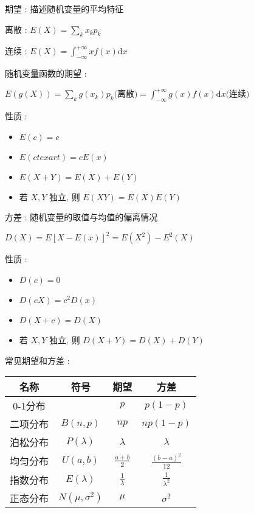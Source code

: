 \documentclass[UTF8, 12pt]{ctexart}
\begin{document}
	\noindent 期望 : 描述随机变量的平均特征

		离散 : $ E(X) = \sum\limits_{k} x_{k}p_{k} $

		连续 : $ E(X) = \int_{-\infty}^{+\infty}xf(x)\mathrm{d}x $

		随机变量函数的期望 : 

		$ E(g(X)) = \sum\limits_{k}g(x_{k})p_{k}\text{(离散)} = \int_{-\infty}^{+\infty}g(x)f(x)\mathrm{d}x\text{(连续)} $

		性质 :
		\begin{itemize}[leftmargin = 4em]
			\item $ E(c) = c $
			\item $ E(ctexart) = cE(x) $
			\item $ E(X + Y) = E(X) + E(Y) $
			\item 若 $ X, Y $ 独立, 则 $ E(XY) = E(X)E(Y) $
		\end{itemize}
	
	\noindent 方差 : 随机变量的取值与均值的偏离情况
		
		$ D(X) = E[X - E(x)]^{2} = E(X^{2}) - E^{2}(X) $

		性质 :
		\begin{itemize}[leftmargin = 4em]
			\item $ D(c) = 0 $
			\item $ D(cX) = c^{2}D(x) $
			\item $ D(X + c) = D(X) $
			\item 若 $ X, Y $ 独立, 则 $ D(X + Y) = D(X) + D(Y) $
		\end{itemize}

	\noindent 常见期望和方差 : 
	\begin{table}[ht]
		\begin{tabular}{|c|c|c|c|}
			\hline
			名称 & 符号 & 期望 & 方差 \\ \hline
			0-1分布 & & $ p $ & $ p(1-p) $ \\ \hline
			二项分布 & $ B(n, p) $ & $ np $ & $ np(1-p) $ \\ \hline
			泊松分布 & $ P(\lambda) $ & $ \lambda $ & $ \lambda $ \\ \hline
			均匀分布 & $ U(a, b) $ & $ \frac{a+b}{2} $ & $ \frac{(b-a)^{2}}{12} $ \\ \hline
			指数分布 & $ E(\lambda) $ & $ \frac{1}{\lambda} $ & $ \frac{1}{\lambda^{2}} $ \\ \hline
			正态分布 & $ N(\mu, \sigma^{2}) $ & $ \mu $ & $ \sigma^{2} $ \\ \hline
		\end{tabular}
	\end{table}
\end{document}
